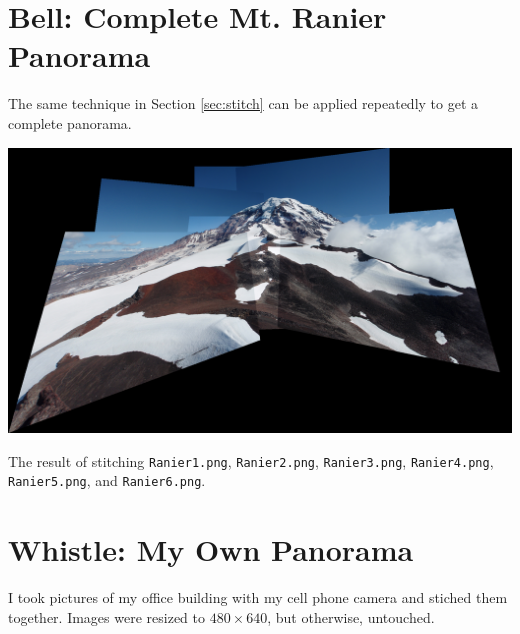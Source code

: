 \documentclass[letterpaper]{article}
\begin{document}
\section*{Bell: Complete Mt. Ranier Panorama}

The same technique in Section \ref{sec:stitch} can be applied repeatedly to get a
complete panorama.

\begin{center}
  \includegraphics[width=\textwidth]{all_stitched.png}
  
  The result of stitching \texttt{Ranier1.png}, \texttt{Ranier2.png},
  \texttt{Ranier3.png}, \texttt{Ranier4.png}, \texttt{Ranier5.png}, and
  \texttt{Ranier6.png}.
\end{center}

\section*{Whistle: My Own Panorama}

I took pictures of my office building with my cell phone camera and stiched them
together. Images were resized to $480 \times 640$, but otherwise, untouched.
\end{document}
